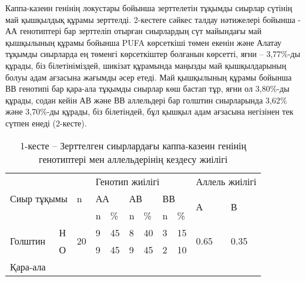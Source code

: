 \begin{multicols}{2}
Каппа-казеин генінің локустары бойынша зерттелетін тұқымды сиырлар
сүтінің май қышқылдық құрамы зерттелді. 2-кестеге сәйкес талдау
нәтижелері бойынша - АА генотиптері бар зерттеліп отырған сиырлардың сүт
майындағы май қышқылының құрамы бойынша PUFA көрсеткіші төмен екенін
және Алатау тұқымды сиырларда ең төменгі көрсеткіштер болғанын көрсетті,
яғни -- 3,77\%-ды құрады, біз білетініміздей, шикізат құрамында маңызды
май қышқылдарының болуы адам ағзасына жағымды әсер етеді. Май қышқылының
құрамы бойынша ВВ генотипі бар қара-ала тұқымды сиырлар көш бастап тұр,
яғни ол 3,80\%-ды құрады, содан кейін АВ және ВВ аллельдері бар голштин
сиырларында 3,62\% және 3,70\%-ды құрады, біз білетіндей, бұл қышқыл
адам ағзасына негізінен тек сүтпен енеді (2-кесте).
\end{multicols}


\begin{table}[H]
  \centering
  \caption*{1-кесте -- Зерттелген сиырлардағы каппа-казеин генінің генотиптері мен аллельдерінің кездесу жиілігі}
  \begin{tabular}{|ll|l|llllll|ll|}
  \hline
  \multicolumn{2}{|l|}{\multirow{3}{*}{Сиыр тұқымы}} &
    \multirow{3}{*}{n} &
    \multicolumn{6}{l|}{Генотип жиілігі} &
    \multicolumn{2}{l|}{Аллель   жиілігі} \\ \cline{4-11} 
  \multicolumn{2}{|l|}{} &
     &
    \multicolumn{2}{l|}{АА} &
    \multicolumn{2}{l|}{АВ} &
    \multicolumn{2}{l|}{ВВ} &
    \multicolumn{1}{l|}{\multirow{2}{*}{А}} &
    \multirow{2}{*}{В} \\ \cline{4-9}
  \multicolumn{2}{|l|}{} &
     &
    \multicolumn{1}{l|}{n} &
    \multicolumn{1}{l|}{\%} &
    \multicolumn{1}{l|}{n} &
    \multicolumn{1}{l|}{\%} &
    \multicolumn{1}{l|}{n} &
    \% &
    \multicolumn{1}{l|}{} &
     \\ \hline
  \multicolumn{1}{|l|}{\multirow{2}{*}{Голштин}} &
    Н &
    \multirow{2}{*}{20} &
    \multicolumn{1}{l|}{9} &
    \multicolumn{1}{l|}{45} &
    \multicolumn{1}{l|}{8} &
    \multicolumn{1}{l|}{40} &
    \multicolumn{1}{l|}{3} &
    15 &
    \multicolumn{1}{l|}{\multirow{2}{*}{0.65}} &
    \multirow{2}{*}{0.35} \\ \cline{2-2} \cline{4-9}
  \multicolumn{1}{|l|}{} &
    О &
     &
    \multicolumn{1}{l|}{9} &
    \multicolumn{1}{l|}{45} &
    \multicolumn{1}{l|}{9} &
    \multicolumn{1}{l|}{45} &
    \multicolumn{1}{l|}{2} &
    10 &
    \multicolumn{1}{l|}{} &
     \\ \hline
  \multicolumn{1}{|l|}{\multirow{2}{*}{Қара-ала}} &

\end{tabular}
\end{table}
